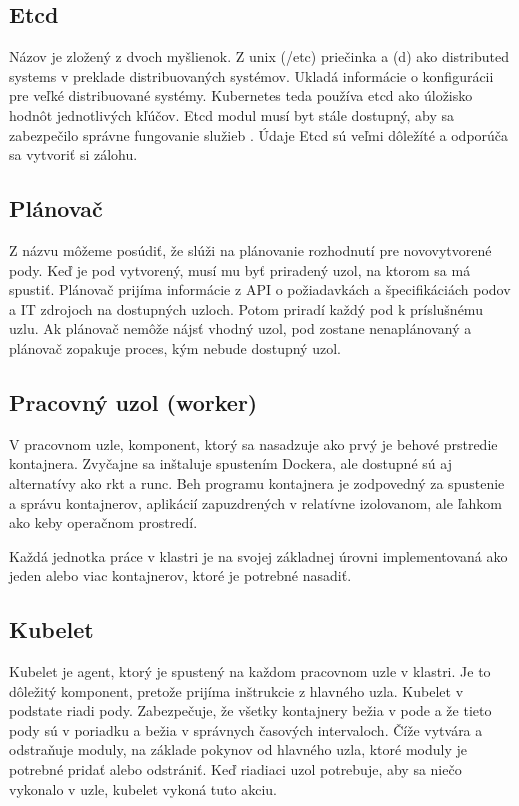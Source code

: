 \subsection*{Etcd}
Názov je zložený z dvoch myšlienok. Z unix (/etc) priečinka a (d) ako distributed systems v preklade distribuovaných systémov. Ukladá informácie o konfigurácii pre veľké distribuované systémy. Kubernetes teda používa etcd ako úložisko hodnôt jednotlivých kľúčov. Etcd modul musí byt stále dostupný, aby sa zabezpečilo správne fungovanie služieb \cite{etcd}. Údaje Etcd sú veľmi dôležíté a odporúča sa vytvoriť si zálohu.

\subsection*{Plánovač}
Z názvu môžeme posúdiť, že slúži na plánovanie rozhodnutí pre novovytvorené pody. Keď je pod vytvorený, musí mu byť priradený uzol, na ktorom sa má spustiť. Plánovač prijíma informácie z API o požiadavkách a špecifikáciách podov a IT zdrojoch na dostupných uzloch. Potom priradí každý pod k príslušnému uzlu. Ak plánovač nemôže nájsť vhodný uzol, pod zostane nenaplánovaný a plánovač zopakuje proces, kým nebude dostupný uzol.

\subsection{Pracovný uzol (worker)}

V pracovnom uzle, komponent, ktorý sa nasadzuje ako prvý je behové prstredie kontajnera. Zvyčajne sa inštaluje spustením Dockera, ale dostupné sú aj alternatívy ako rkt a runc. Beh programu kontajnera je zodpovedný za spustenie a správu kontajnerov, aplikácií zapuzdrených v relatívne izolovanom, ale ľahkom ako keby operačnom prostredí.

Každá jednotka práce v klastri je na svojej základnej úrovni implementovaná ako jeden alebo viac kontajnerov, ktoré je potrebné nasadiť.

\subsection*{Kubelet}
Kubelet je agent, ktorý je spustený na každom pracovnom uzle v klastri. Je to dôležitý komponent, pretože prijíma inštrukcie z hlavného uzla. Kubelet v podstate riadi pody. Zabezpečuje, že všetky kontajnery bežia v pode a že tieto pody sú v poriadku a bežia v správnych časových intervaloch. Číže vytvára a odstraňuje moduly, na základe pokynov od hlavného uzla, ktoré moduly je potrebné pridať alebo odstrániť. Keď riadiaci uzol potrebuje, aby sa niečo vykonalo v uzle, kubelet vykoná tuto akciu.


